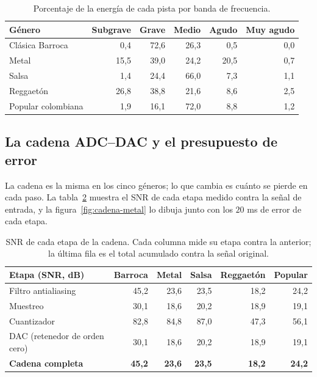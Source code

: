 \documentclass[11pt,a4paper]{article}
\begin{document}
\begin{table}[H]
\centering
\small
\begin{tabular}{@{}l r r r r r@{}}
\toprule
\textbf{Género} & \textbf{Subgrave} & \textbf{Grave} & \textbf{Medio} &
\textbf{Agudo} & \textbf{Muy agudo} \\
\midrule
Clásica\,\textperiodcentered{}\,Barroca & 0,4 & 72,6 & 26,3 & 0,5 & 0,0 \\
Metal & 15,5 & 39,0 & 24,2 & 20,5 & 0,7 \\
Salsa & 1,4 & 24,4 & 66,0 & 7,3 & 1,1 \\
Reggaetón & 26,8 & 38,8 & 21,6 & 8,6 & 2,5 \\
Popular colombiana & 1,9 & 16,1 & 72,0 & 8,8 & 1,2 \\
\bottomrule
\end{tabular}
\caption{Porcentaje de la energía de cada pista por banda de frecuencia.}
\label{tab:bandas}
\end{table}

\subsection{La cadena ADC--DAC y el presupuesto de error}

La cadena es la misma en los cinco géneros; lo que cambia es cuánto se pierde
en cada paso. La tabla~\ref{tab:cadena} muestra el SNR de cada etapa medido
contra la señal de entrada, y la figura~\ref{fig:cadena-metal} lo dibuja junto
con los \(20\) ms de error de cada etapa.

\begin{table}[H]
\centering
\small
\begin{tabular}{@{}l r r r r r@{}}
\toprule
\textbf{Etapa (SNR, dB)} & \textbf{Barroca} & \textbf{Metal} &
\textbf{Salsa} & \textbf{Reggaetón} & \textbf{Popular} \\
\midrule
Filtro antialiasing & 45,2 & 23,6 & 23,5 & 18,2 & 24,2 \\
Muestreo & 30,1 & 18,6 & 20,2 & 18,9 & 19,1 \\
Cuantizador & 82,8 & 84,8 & 87,0 & 47,3 & 56,1 \\
DAC (retenedor de orden cero) & 30,1 & 18,6 & 20,2 & 18,9 & 19,1 \\
\midrule
\textbf{Cadena completa} & \textbf{45,2} & \textbf{23,6} & \textbf{23,5} &
\textbf{18,2} & \textbf{24,2} \\
\bottomrule
\end{tabular}
\caption{SNR de cada etapa de la cadena. Cada columna mide su etapa contra la
anterior; la última fila es el total acumulado contra la señal original.}
\label{tab:cadena}
\end{table}
\end{document}
